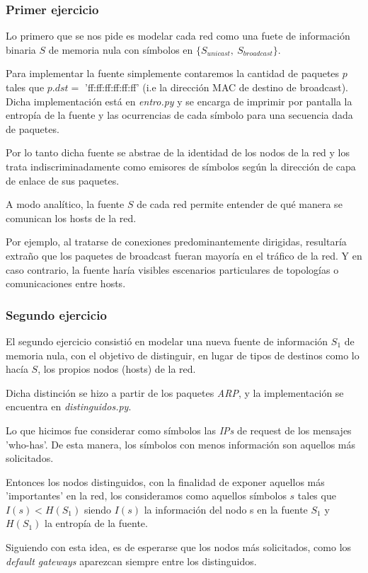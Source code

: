 \subsubsection{Primer ejercicio}

Lo primero que se nos pide es modelar cada red como una fuete de información binaria $S$ de memoria nula con símbolos en $\{S_{unicast},\ S_{broadcast}\}$.

Para implementar la fuente simplemente contaremos la cantidad de paquetes $p$ tales que $p.dst =$ 'ff:ff:ff:ff:ff:ff' (i.e la dirección MAC de destino de broadcast). Dicha implementación está en \emph{entro.py} y se encarga de imprimir por pantalla la entropía de la fuente y las ocurrencias de cada símbolo para una secuencia dada de paquetes.

Por lo tanto dicha fuente se abstrae de la identidad de los nodos de la red y los trata indiscriminadamente como emisores de símbolos según la dirección de capa de enlace de sus paquetes.

A modo analítico, la fuente $S$ de cada red permite entender de qué manera se comunican los hosts de la red.

Por ejemplo, al tratarse de conexiones predominantemente dirigidas, resultaría extraño que los paquetes de broadcast fueran mayoría en el tráfico de la red. Y en caso contrario, la fuente haría visibles escenarios particulares de topologías o comunicaciones entre hosts.

\subsubsection{Segundo ejercicio}

El segundo ejercicio consistió en modelar una nueva fuente de información $S_1$ de memoria nula, con el objetivo de distinguir, en lugar de tipos de destinos como lo hacía $S$, los propios nodos (hosts) de la red.

Dicha distinción se hizo a partir de los paquetes \emph{ARP}, y la implementación se encuentra en \emph{distinguidos.py}.

Lo que hicimos fue considerar como símbolos las \emph{IPs} de request de los mensajes 'who-has'. De esta manera, los símbolos con menos información son aquellos más solicitados.

Entonces los nodos distinguidos, con la finalidad de exponer aquellos más 'importantes' en la red, los consideramos como aquellos símbolos $s$ tales que $I(s) < H(S_1)$ siendo $I(s)$ la información del nodo s en la fuente $S_1$ y $H(S_1)$ la entropía de la fuente.

Siguiendo con esta idea, es de esperarse que los nodos más solicitados, como los \emph{default gateways} aparezcan siempre entre los distinguidos.
